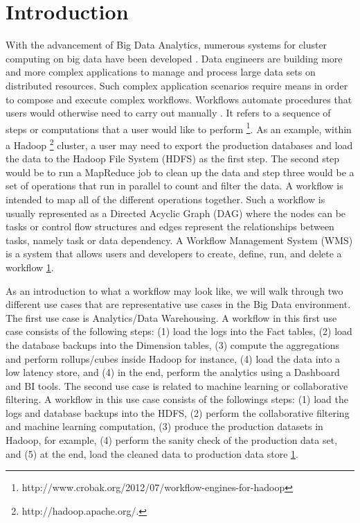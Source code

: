 \chapter{Introduction}
With the advancement of Big Data Analytics, numerous systems for cluster computing on big data have been developed \cite{zaharia2012resilient,battre2010nephele,thusoo2010hive,dean2008mapreduce,yu2008dryadlinq,olston2008pig}. Data engineers are building more and more complex applications to manage and process large data sets on distributed resources. Such complex application scenarios require means in order to compose and execute complex workflows. Workflows automate procedures that users would otherwise need to carry out manually \cite{deelman2009workflows}. It refers to a sequence of steps or computations that a user would like to perform 
\footnote{\label{crobak}http://www.crobak.org/2012/07/workflow-engines-for-hadoop}. As an example, within a Hadoop \footnote{\label{hadoop}http://hadoop.apache.org/.} cluster, a user may need to export the production databases and load the data to the Hadoop File System (HDFS) as the first step. The second step would be to run a MapReduce job to clean up the data and step three would be a set of operations that run in parallel to count and filter the data. A workflow is intended to map all of the different operations together. Such a workflow is usually represented as a Directed Acyclic Graph (DAG) where the nodes can be tasks or control flow structures and edges represent the relationships between tasks, namely task or data dependency. A Workflow Management System (WMS) is a system that allows users and developers to create, define, run, and delete a workflow \cref{crobak}. 
	
As an introduction to what a workflow may look like, we will walk through two different use cases that are representative use cases in the Big Data environment. The first use case is Analytics/Data Warehousing. A workflow in this first use case consists of the following steps: (1) load the logs into the Fact tables, (2) load the database backups into the Dimension tables, (3) compute the aggregations and perform rollups/cubes inside Hadoop for instance, (4) load the data into a low latency store, and (4) in the end, perform the analytics using a Dashboard and BI tools. The second use case is related to machine learning or collaborative filtering. A workflow in this use case consists of the followings steps: (1) load the logs and database backups into the HDFS, (2) perform the collaborative filtering and machine learning computation, (3) produce the production datasets in Hadoop, for example, (4) perform the sanity check of the production data set, and (5) at the end, load the cleaned data to production data store \cref{crobak}.

